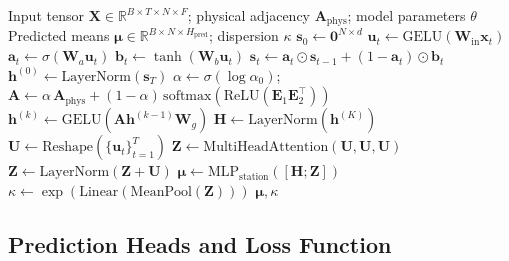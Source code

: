 \begin{algorithm}[H]
\caption{DTS-GSSF Forward Pass}
\label{alg:forward}
\begin{algorithmic}[1]
\Require Input tensor $\mathbf{X} \in \mathbb{R}^{B \times T \times N \times F}$; physical adjacency $\mathbf{A}_{\text{phys}}$; model parameters $\theta$
\Ensure Predicted means $\boldsymbol{\mu} \in \mathbb{R}^{B \times N \times H_{\text{pred}}}$; dispersion $\kappa$
\State $\mathbf{s}_0 \leftarrow \mathbf{0}^{N \times d}$ 
    \State $\mathbf{u}_t \leftarrow \text{GELU}(\mathbf{W}_{\text{in}} \mathbf{x}_t)$ 
    \State $\mathbf{a}_t \leftarrow \sigma(\mathbf{W}_a \mathbf{u}_t)$ 
    \State $\mathbf{b}_t \leftarrow \tanh(\mathbf{W}_b \mathbf{u}_t)$ 
    \State $\mathbf{s}_t \leftarrow \mathbf{a}_t \odot \mathbf{s}_{t-1} + (1 - \mathbf{a}_t) \odot \mathbf{b}_t$ 
\EndFor
\State $\mathbf{h}^{(0)} \leftarrow \text{LayerNorm}(\mathbf{s}_T)$
\State $\alpha \leftarrow \sigma(\log \alpha_0)$; \quad $\mathbf{A} \leftarrow \alpha \, \mathbf{A}_{\text{phys}} + (1 - \alpha) \, \text{softmax}(\text{ReLU}(\mathbf{E}_1 \mathbf{E}_2^\top))$ 
    \State $\mathbf{h}^{(k)} \leftarrow \text{GELU}(\mathbf{A} \mathbf{h}^{(k-1)} \mathbf{W}_g)$ 
\EndFor
\State $\mathbf{H} \leftarrow \text{LayerNorm}(\mathbf{h}^{(K)})$
\State $\mathbf{U} \leftarrow \text{Reshape}(\{\mathbf{u}_t\}_{t=1}^T)$ 
\State $\mathbf{Z} \leftarrow \text{MultiHeadAttention}(\mathbf{U}, \mathbf{U}, \mathbf{U})$ 
\State $\mathbf{Z} \leftarrow \text{LayerNorm}(\mathbf{Z} + \mathbf{U})$ 
\State $\boldsymbol{\mu} \leftarrow \text{MLP}_{\text{station}}([\mathbf{H}; \mathbf{Z}])$ 
\State $\kappa \leftarrow \exp(\text{Linear}(\text{MeanPool}(\mathbf{Z})))$ 
\State \Return $\boldsymbol{\mu}, \kappa$
\end{algorithmic}
\end{algorithm}

\subsection{Prediction Heads and Loss Function}

